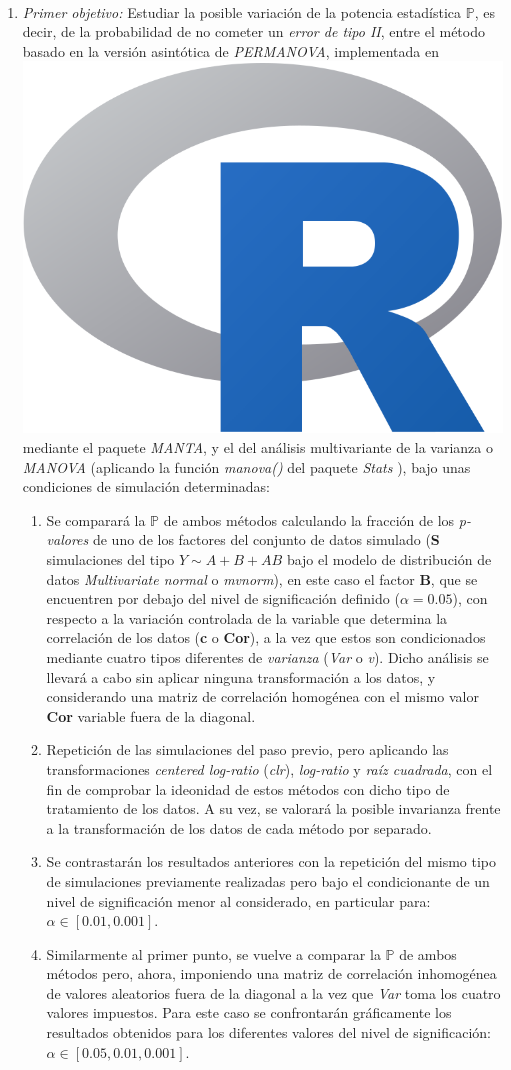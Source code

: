 \documentclass[IB,BIB]{TFUOC}%
\newcommand{\Rlogo}{\protect\includegraphics[height=2.5ex,keepaspectratio]{Rlogo.png}}
\begin{document}
\

\begin{enumerate}[label=\textnormal{\Roman*.}]
\item \label{th1} \textit{Primer objetivo:} Estudiar la posible variación de la potencia estadística \( \mathbb P \), es decir, de la probabilidad de no cometer un \textit{\gls{error de tipo II}}, entre el método basado en la versión asintótica de \textit{PERMANOVA}, implementada en \hspace{-.2em}\Rlogo\hspace{+.1em} mediante el paquete \textit{MANTA}, y el del análisis multivariante de la varianza o \textit{MANOVA} (aplicando la función \textit{manova()} del paquete \textit{Stats} \cite{noauthor_r_nodate}), bajo unas condiciones de simulación determinadas:

   \footnotesize
   \begin{enumerate}[label=\textnormal{(\alph*)}]
   \item Se comparará la \( \mathbb P \) de ambos métodos calculando la fracción de los \textit{p-valores} de uno de los factores del conjunto de datos simulado (\textbf{S} simulaciones del tipo \( Y \sim A + B + AB \) bajo el modelo de distribución de datos \textit{Multivariate normal} o \textit{mvnorm}), en este caso el factor \textbf{B}, que se encuentren por debajo del nivel de significación definido (\( \alpha = \text{0.05} \)), con respecto a la variación controlada de la variable que determina la correlación de los datos (\textbf{c} o \textbf{Cor}), a la vez que estos son condicionados mediante cuatro tipos diferentes de \textit{varianza} (\textit{Var} o \textit{v}). Dicho análisis se llevará a cabo sin aplicar ninguna transformación a los datos, y considerando una matriz de correlación homogénea con el mismo valor \textbf{Cor} variable fuera de la diagonal.
   \item Repetición de las simulaciones del paso previo, pero aplicando las transformaciones \textit{centered log-ratio} (\textit{clr}), \textit{log-ratio} y \textit{raíz cuadrada}, con el fin de comprobar la ideonidad de estos métodos con dicho tipo de tratamiento de los datos. A su vez, se valorará la posible invarianza frente a la transformación de los datos de cada método por separado.
   \item Se contrastarán los resultados anteriores con la repetición del mismo tipo de simulaciones previamente realizadas pero bajo el condicionante de un nivel de significación menor al considerado, en particular para: \( \alpha \in [\text{0.01}, \text{0.001}] \).
   \item Similarmente al primer punto, se vuelve a comparar la \( \mathbb P \) de ambos métodos pero, ahora, imponiendo una matriz de correlación inhomogénea de valores aleatorios fuera de la diagonal a la vez que \textit{Var} toma los cuatro valores impuestos. Para este caso se confrontarán gráficamente los resultados obtenidos para los diferentes valores del nivel de significación: \( \alpha \in [\text{0.05}, \text{0.01}, \text{0.001}] \).
   \end{enumerate}
   \normalsize


\end{enumerate}
\end{document}
